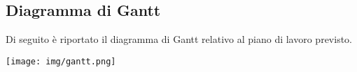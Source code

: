 
\subsection{Diagramma di Gantt}
	Di seguito è riportato il diagramma di Gantt relativo al piano di lavoro previsto.
	\begin{center}
		\texttt{[image: img/gantt.png]}
	\end{center}
